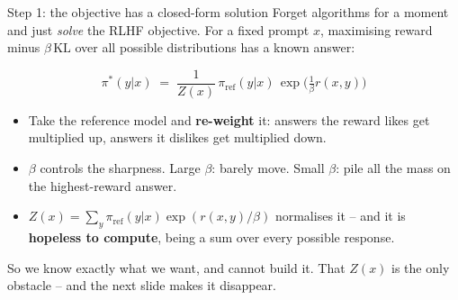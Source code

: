 \documentclass[aspectratio=169]{beamer}
\begin{document}
\begin{frame}{Step 1: the objective has a closed-form solution}
  \small
  Forget algorithms for a moment and just \emph{solve} the RLHF objective. For a fixed prompt
  $x$, maximising reward minus $\beta\,\mathrm{KL}$ over all possible distributions has a known
  answer:

  \vskip 4pt
  \begin{center}
  \begin{tcolorbox}[colback=lightbg, colframe=popblue, boxrule=0.8pt, arc=2pt, width=0.8\textwidth]
    \[ \pi^*(y|x) \;=\; \frac{1}{Z(x)}\, \pi_{\text{ref}}(y|x)\, \exp\!\Big(\tfrac{1}{\beta} r(x,y)\Big) \]
  \end{tcolorbox}
  \end{center}

  \vskip 6pt
  \begin{itemize}\itemsep3pt
    \item Take the reference model and \textbf{re-weight} it: answers the reward likes get
          multiplied up, answers it dislikes get multiplied down.
    \item $\beta$ controls the sharpness. Large $\beta$: barely move. Small $\beta$: pile all the
          mass on the highest-reward answer.
    \item $Z(x) = \sum_y \pi_{\text{ref}}(y|x)\exp(r(x,y)/\beta)$ normalises it -- and it is
          \textbf{hopeless to compute}, being a sum over every possible response.
  \end{itemize}

  \vskip 6pt
  \begin{tcolorbox}[colback=armorange!12, colframe=armorange, boxrule=0.6pt, arc=2pt]
    \small
    So we know exactly what we want, and cannot build it. That $Z(x)$ is the only obstacle --
    and the next slide makes it disappear.
  \end{tcolorbox}
\end{frame}
\end{document}
